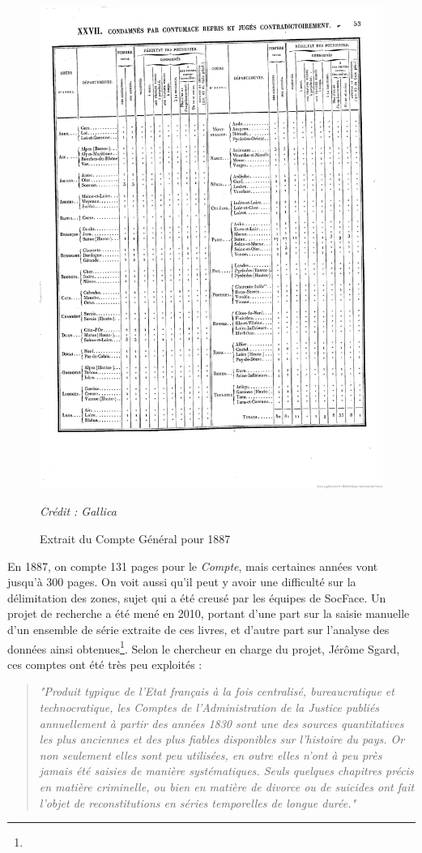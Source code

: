 \begin{figure}[H]
    \centering
    \includegraphics[width=0.7\linewidth]{Figures/Partie 3/Fig.3.3 - Compte Général.jpeg}
    \caption{Extrait du Compte Général pour 1887}
    \textit{Crédit : Gallica}
    \label{fig:Fig.3.3}
\end{figure}

\clearpage
En 1887, on compte 131 pages pour le \textit{Compte}, mais certaines années vont jusqu’à 300 pages. On voit aussi qu’il peut y avoir une difficulté sur la délimitation des zones, sujet qui a été creusé par les équipes de SocFace. 
Un projet de recherche a été mené en 2010, portant d’une part sur la saisie manuelle d’un ensemble de série extraite de ces livres, et d’autre part sur l’analyse des données ainsi obtenues\footnote{}. Selon le chercheur en charge du projet, Jérôme Sgard, ces comptes ont été très peu exploités : 
\begin{quote}
    \textit{"Produit typique de l’Etat français à la fois centralisé, bureaucratique et technocratique, les Comptes de l’Administration de la Justice publiés annuellement à partir des années 1830 sont une des sources quantitatives les plus anciennes et des plus fiables disponibles sur l’histoire du pays. Or non seulement elles sont peu utilisées, en outre elles n’ont à peu près jamais été saisies de manière systématiques. Seuls quelques chapitres précis en matière criminelle, ou bien en matière de divorce ou de suicides ont fait l’objet de reconstitutions en séries temporelles de longue durée."}
\end{quote}

